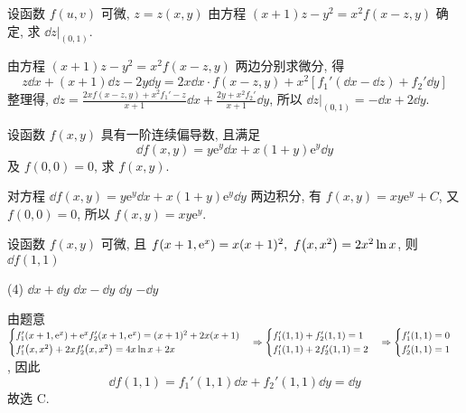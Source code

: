 \begin{example}[2016 数一]
    设函数 $f(u,v)$ 可微, $z=z(x,y)$ 由方程 $(x+1)z-y^2=x^2f(x-z,y)$ 确定, 求 $\dd z|_{(0,1)}.$
\end{example}
\begin{solution}
    由方程 $(x+1)z-y^2=x^2f(x-z,y)$ 两边分别求微分, 得
    $$z\dd x+(x+1)\dd z-2y\dd y=2x\dd x\cdot f(x-z,y)+x^2\left[f_1'(\dd x-\dd z)+f_2'\dd y\right]$$
    整理得, $\displaystyle\dd z=\frac{2xf(x-z,y)+x^2f_1'-z}{x+1}\dd x+\frac{2y+x^2f_2'}{x+1}\dd y$, 所以 $\displaystyle\dd z|_{(0,1)}=-\dd x+2\dd y.$
\end{solution}

\begin{example}[第九届数学竞赛决赛]
    设函数 $f(x,y)$ 具有一阶连续偏导数, 且满足 $$\dd f(x,y)=y\mathrm{e}^y\dd x+x(1+y)\mathrm{e}^y\dd y$$ 及 $f(0,0)=0$, 求 $f(x,y).$
\end{example}
\begin{solution}
    对方程 $\dd f(x,y)=y\mathrm{e}^y\dd x+x(1+y)\mathrm{e}^y\dd y$ 两边积分, 有 $f(x,y)=xy\mathrm{e}^y+C$, 又 $f(0,0)=0$, 所以 $f(x,y)=xy\mathrm{e}^y$.
\end{solution}

\begin{example}[2021 数一]
    设函数 $f(x,y)$ 可微, 且 $f\qty(x+1,\mathrm{e}^x)=x(x+1)^2,~f\qty(x,x^2)=2x^2\ln x$, 则 $\dd f(1,1)$
    \begin{tasks}(4)
        \task $\dd x+\dd y$
        \task $\dd x-\dd y$
        \task $\dd y$
        \task $-\dd y$
    \end{tasks}
\end{example}
\begin{solution}
    由题意 $\begin{cases}
            f_1'\qty(x+1,\mathrm{e}^x)+\mathrm{e}^xf_2'\qty(x+1,\mathrm{e}^x)=(x+1)^2+2x(x+1) \\
            f_1'\qty(x,x^2)+2xf_2'\qty(x,x^2)=4x\ln x+2x
        \end{cases}\Rightarrow \begin{cases}
            f_1'(1,1)+f_2'(1,1)=1 \\
            f_1'(1,1)+2f_2'(1,1)=2
        \end{cases}\Rightarrow \begin{cases}
            f_1'(1,1)=0 \\
            f_2'(1,1)=1
        \end{cases}$, 因此
    $$\dd f(1,1)=f_1'(1,1)\dd x+f_2'(1,1)\dd y=\dd y$$
    故选 C.
\end{solution}

